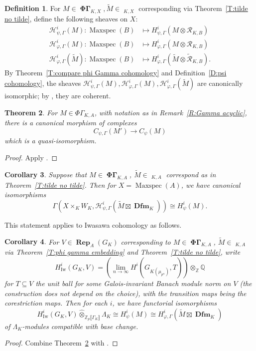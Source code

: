 \documentclass[12pt]{amsart}
\newtheorem{theorem}{Theorem}[section]
\newtheorem{cor}[theorem]{Corollary}
\theoremstyle{definition}
\newtheorem{defn}[theorem]{Definition}
\numberwithin{equation}{theorem}
\newcommand{\QQ}{\mathbb{Q}}
\newcommand{\ZZ}{\mathbb{Z}}
\newcommand{\calH}{\mathcal{H}}
\newcommand{\calR}{\mathcal{R}}
\DeclareMathOperator{\Dfm}{\mathbf{Dfm}}
\DeclareMathOperator{\Iw}{Iw}
\DeclareMathOperator{\Maxspec}{Maxspec}
\DeclareMathOperator{\PhiGamma}{\mathbf{\Phi \Gamma}}
\DeclareMathOperator{\PhiGammatilde}{\widetilde{\mathbf{\Phi \Gamma}}}
\DeclareMathOperator{\Rep}{\mathbf{Rep}}
\begin{document}
\begin{defn}
For $M \in \PhiGamma_{K,X}, \tilde{M} \in \PhiGammatilde_{K,X}$ corresponding via
Theorem~\ref{T:tilde no tilde},
define the following sheaves on $X$:
\begin{align*}
\calH^i_{\psi, \Gamma}(M): \Maxspec(B) &\mapsto H^i_{\psi, \Gamma}(M \otimes \calR_{K,B}) \\
\calH^i_{\varphi, \Gamma}(M): \Maxspec(B) &\mapsto H^i_{\varphi, \Gamma}(M \otimes \calR_{K,B}) \\
\calH^i_{\varphi, \Gamma}(\tilde{M}): \Maxspec(B) &\mapsto H^i_{\varphi, \Gamma}(\tilde{M} \otimes \tilde{\calR}_{K,B}).
\end{align*}
By Theorem~\ref{T:compare phi Gamma cohomology} and
Definition~\ref{D:psi cohomology}, the sheaves $\calH^i_{\psi, \Gamma}(M),
\calH^i_{\varphi,\Gamma}(M), \calH^i_{\varphi,\Gamma}(\tilde{M})$
are canonically isomorphic; by 
\cite[Theorem~4.4.3, Remark~4.4.4]{kpx}, they are coherent.
\end{defn}

\begin{theorem} \label{T:psi to deformation}
For $M \in \Phi\Gamma_{K,A}$, with notation as in Remark~\ref{R:Gamma acyclic},
there is a canonical morphism of complexes
\[
C_{\psi, \Gamma}(M') \to C_{\psi}(M)
\]
which is a quasi-isomorphism.
\end{theorem}
\begin{proof}
Apply \cite[Theorem~4.4.8]{kpx}.
\end{proof}
\begin{cor} \label{C:psi to deformation}
Suppose that $M \in \PhiGamma_{K,A}$, $\tilde{M} \in \PhiGammatilde_{K,A}$ correspond as in 
Theorem~\ref{T:tilde no tilde}. Then for $X = \Maxspec(A)$,
we have canonical isomorphisms
\[
\Gamma(X \times_K W_K, \calH^i_{\psi, \Gamma}(\tilde{M} \boxtimes \Dfm_K)) \cong H^i_\psi(M).
\]
\end{cor}

This statement applies to Iwasawa cohomology as follows.
\begin{cor} \label{C:Iwasawa}
For $V \in \Rep_A(G_K)$ corresponding to $M \in \PhiGamma_{K,A}$,
$\tilde{M} \in \PhiGammatilde_{K,A}$ via 
Theorem~\ref{T:phi gamma embedding}
and Theorem~\ref{T:tilde no tilde},
write
\[
H^i_{\Iw}(G_K, V) = \left( \lim_{n \to \infty} H^i(G_{K(\mu_{p^n})}, T) \right) \otimes_{\ZZ} \QQ
\]
for $T \subseteq V$ the unit ball for some Galois-invariant Banach module norm on $V$
(the construction does not depend on the choice), with the transition maps being the corestriction maps. Then for each $i$, we have functorial isomorphisms
\[
H^i_{\Iw}(G_K, V) \widehat{\otimes}_{\ZZ_p\llbracket \Gamma_K \rrbracket} \Lambda_K \cong H^i_\psi(M) \cong H^i_{\varphi, \Gamma}(\tilde{M} \boxtimes \Dfm_K)
\]
of $\Lambda_K$-modules compatible with base change.
\end{cor}
\begin{proof}
Combine Theorem~\ref{T:psi to deformation} with \cite[Corollary~4.4.11]{kpx}.
\end{proof}
\end{document}
